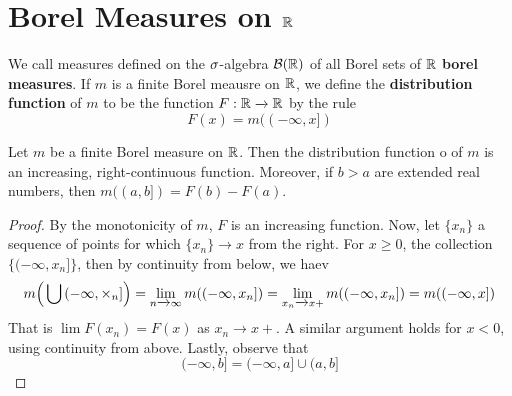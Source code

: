 \section{Borel Measures on $\mathbb{R}$}

\begin{definition}
    We call measures defined on the $\sigma$-algebra  $\mathcal{B}(\mathbb{R})$ of all Borel sets of
    $\mathbb{R}$  \textbf{borel measures}. If $m$ is a finite Borel meausre on $\mathbb{R}$, we
    define the  \textbf{distribution function} of $m$ to be the function $F:\mathbb{R}
    \xrightarrow{} \mathbb{R}$ by the rule
    \begin{equation*}
        F(x)=m((-\infty, x])
    \end{equation*}
\end{definition}

\begin{lemma}\label{lemma_1.4.1}
    Let $m$ be a finite Borel measure on  $\mathbb{R}$. Then the distribution function o
    of  $m$ is an increasing, right-continuous function. Moreover, if  $b>a$ are
    extended real numbers, then  $m((a,b])=F(b)-F(a)$.
\end{lemma}
\begin{proof}
    By the monotonicity of $m$,  $F$ is an increasing function. Now, let
    $\{x_n\}$ a sequence of points for which $\{x_n\} \xrightarrow{} x$ from the
    right. For $x \geq 0$, the collection $\{(-\infty, x_n]\}$, then by
    continuity from below, we haev
    \begin{equation*}
        m\Big{(} \bigcup{(-\infty, \times_n]} \Big{)}=\lim_{n \xrightarrow{}
        \infty}{m((-\infty, x_n])}=
        \lim_{x_n \xrightarrow{} x+}{m((-\infty, x_n])}=m((-\infty, x])
    \end{equation*}
    That is $\lim{F(x_n)}=F(x)$ as $x_n \xrightarrow{} x+$. A similar argument
    holds for $x<0$, using continuity from above. Lastly, observe that
    \begin{equation}
        (-\infty, b]=(-\infty, a] \cup (a, b]
    \end{equation}
\end{proof}

